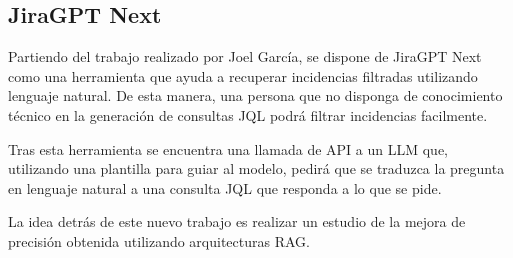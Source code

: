 \subsection{JiraGPT Next}
Partiendo del trabajo realizado por Joel García, se dispone de JiraGPT Next como una herramienta que ayuda a recuperar incidencias filtradas utilizando lenguaje natural. De esta manera, una persona que no disponga de conocimiento técnico en la generación de consultas JQL podrá filtrar incidencias facilmente.

Tras esta herramienta se encuentra una llamada de API a un LLM que, utilizando una plantilla para guiar al modelo, pedirá que se traduzca la pregunta en lenguaje natural a una consulta JQL que responda a lo que se pide.

La idea detrás de este nuevo trabajo es realizar un estudio de la mejora de precisión obtenida utilizando arquitecturas RAG.